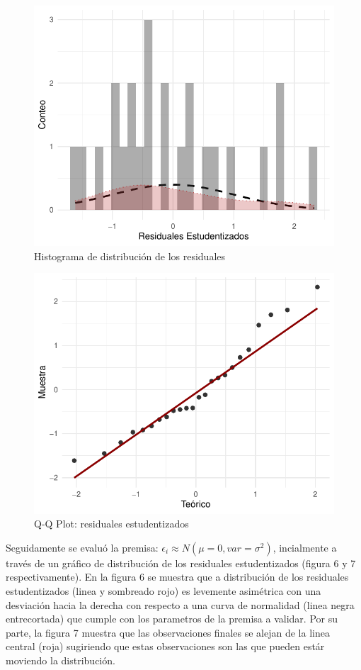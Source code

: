 \documentclass[
]{article}
\begin{document}
\begin{figure}
\centering
\includegraphics{diagnosticorrpp_files/figure-latex/gráfica para distribución de residuales-1.pdf}
\caption{Histograma de distribución de los residuales}
\end{figure}

\begin{figure}
\centering
\includegraphics{diagnosticorrpp_files/figure-latex/qqplot para distribuciones de residuales-1.pdf}
\caption{Q-Q Plot: residuales estudentizados}
\end{figure}

Seguidamente se evaluó la premisa:
\(\epsilon_i \approx N(\mu =0, var=\sigma^2)\), incialmente a través de
un gráfico de distribución de los residuales estudentizados (figura 6 y
7 respectivamente). En la figura 6 se muestra que a distribución de los
residuales estudentizados (linea y sombreado rojo) es levemente
asimétrica con una desviación hacia la derecha con respecto a una curva
de normalidad (linea negra entrecortada) que cumple con los parametros
de la premisa a validar. Por su parte, la figura 7 muestra que las
observaciones finales se alejan de la linea central (roja) sugiriendo
que estas observaciones son las que pueden estár moviendo la
distribución.
\end{document}
